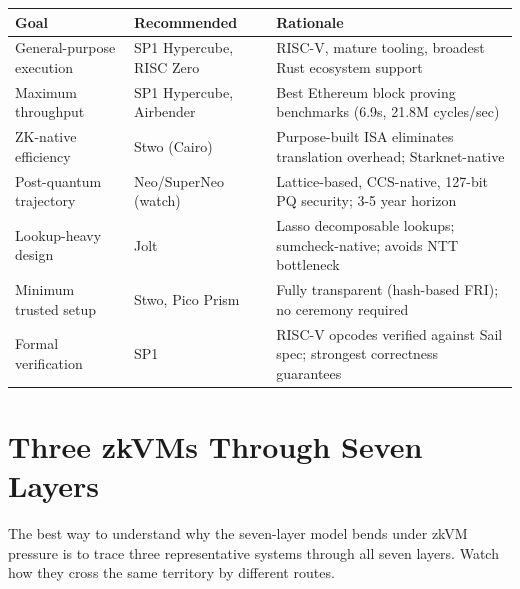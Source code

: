 \documentclass[
  11pt,
  openany]{report}
\begin{document}
\begin{longtable}[]{@{}
  >{\raggedright\arraybackslash}p{}
  >{\raggedright\arraybackslash}p{}
  >{\raggedright\arraybackslash}p{}@{}}
\toprule\noalign{}
\begin{minipage}[b]{\linewidth}\raggedright
Goal
\end{minipage} & \begin{minipage}[b]{\linewidth}\raggedright
Recommended
\end{minipage} & \begin{minipage}[b]{\linewidth}\raggedright
Rationale
\end{minipage} \\
\midrule\noalign{}
\arrayrulecolor{MidnightBlue}\midrule\arrayrulecolor{MidnightBorder}
\endhead
\bottomrule\noalign{}
\endlastfoot
General-purpose execution & SP1 Hypercube, RISC Zero & RISC-V, mature tooling,
broadest Rust ecosystem support \\
Maximum throughput & SP1 Hypercube, Airbender & Best Ethereum block proving
benchmarks (6.9s, 21.8M cycles/sec) \\
ZK-native efficiency & Stwo (Cairo) & Purpose-built ISA eliminates translation
overhead; Starknet-native \\
Post-quantum trajectory & Neo/SuperNeo (watch) & Lattice-based, CCS-native,
127-bit PQ security; 3-5 year horizon \\
Lookup-heavy design & Jolt & Lasso decomposable lookups; sumcheck-native; avoids
NTT bottleneck \\
Minimum trusted setup & Stwo, Pico Prism & Fully transparent (hash-based FRI);
no ceremony required \\
Formal verification & SP1 & 62 RISC-V opcodes verified against Sail spec;
strongest correctness guarantees \\
\end{longtable}

\section{Three zkVMs Through Seven
Layers}\label{three-zkvms-through-seven-layers}

The best way to understand why the seven-layer model bends under zkVM pressure
is to trace three representative systems through all seven layers. Watch how
they cross the same territory by different routes.
\end{document}
